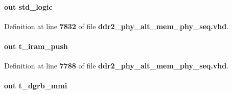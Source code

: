 \paragraph[{dgrb\+\_\+ctrl\+\_\+ac\+\_\+nt\+\_\+good}]{ {\bfseries \textcolor{keywordflow}{out}\textcolor{vhdlchar}{ }} {\bfseries \textcolor{comment}{std\+\_\+logic}\textcolor{vhdlchar}{ }} \hspace{0.3cm}{\ttfamily [Port]}}\label{classddr2__phy__alt__mem__phy__dgrb_a26ade48b86913475be357a61d8a33db1}


Definition at line {\bf 7832} of file {\bf ddr2\+\_\+phy\+\_\+alt\+\_\+mem\+\_\+phy\+\_\+seq.\+vhd}.

\paragraph[{dgrb\+\_\+iram}]{ {\bfseries \textcolor{keywordflow}{out}\textcolor{vhdlchar}{ }} {\bfseries {\bfseries {\bf t\+\_\+iram\+\_\+push}} \textcolor{vhdlchar}{ }} \hspace{0.3cm}{\ttfamily [Port]}}\label{classddr2__phy__alt__mem__phy__dgrb_ab219a531bc1fbbd299ca243a212a270d}


Definition at line {\bf 7788} of file {\bf ddr2\+\_\+phy\+\_\+alt\+\_\+mem\+\_\+phy\+\_\+seq.\+vhd}.

\paragraph[{dgrb\+\_\+mmi}]{ {\bfseries \textcolor{keywordflow}{out}\textcolor{vhdlchar}{ }} {\bfseries {\bfseries {\bf t\+\_\+dgrb\+\_\+mmi}} \textcolor{vhdlchar}{ }} \hspace{0.3cm}{\ttfamily [Port]}}\label{classddr2__phy__alt__mem__phy__dgrb_afa406d43e00c3d052c915f87dc824f82}



